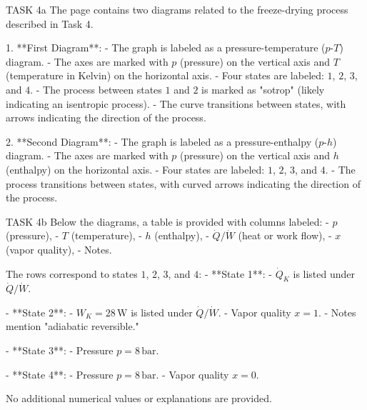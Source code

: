 TASK 4a  
The page contains two diagrams related to the freeze-drying process described in Task 4.  

1. **First Diagram**:  
   - The graph is labeled as a pressure-temperature (\(p\)-\(T\)) diagram.  
   - The axes are marked with \(p\) (pressure) on the vertical axis and \(T\) (temperature in Kelvin) on the horizontal axis.  
   - Four states are labeled: \(1\), \(2\), \(3\), and \(4\).  
   - The process between states \(1\) and \(2\) is marked as "sotrop" (likely indicating an isentropic process).  
   - The curve transitions between states, with arrows indicating the direction of the process.  

2. **Second Diagram**:  
   - The graph is labeled as a pressure-enthalpy (\(p\)-\(h\)) diagram.  
   - The axes are marked with \(p\) (pressure) on the vertical axis and \(h\) (enthalpy) on the horizontal axis.  
   - Four states are labeled: \(1\), \(2\), \(3\), and \(4\).  
   - The process transitions between states, with curved arrows indicating the direction of the process.  

TASK 4b  
Below the diagrams, a table is provided with columns labeled:  
- \(p\) (pressure),  
- \(T\) (temperature),  
- \(h\) (enthalpy),  
- \(\dot{Q}/\dot{W}\) (heat or work flow),  
- \(x\) (vapor quality),  
- Notes.  

The rows correspond to states \(1\), \(2\), \(3\), and \(4\):  
- **State 1**:  
  - \(\dot{Q}_K\) is listed under \(\dot{Q}/\dot{W}\).  

- **State 2**:  
  - \(W_K = 28 \, \text{W}\) is listed under \(\dot{Q}/\dot{W}\).  
  - Vapor quality \(x = 1\).  
  - Notes mention "adiabatic reversible."  

- **State 3**:  
  - Pressure \(p = 8 \, \text{bar}\).  

- **State 4**:  
  - Pressure \(p = 8 \, \text{bar}\).  
  - Vapor quality \(x = 0\).  

No additional numerical values or explanations are provided.